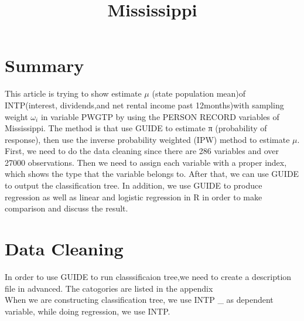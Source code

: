 \documentclass[12pt]{article}
\title{Mississippi}
\begin{document}
\maketitle{}
\newpage
\tableofcontents
\newpage
\section{Summary}
This article is trying to show estimate $\mu$ (state population mean)of INTP(interest, dividends,and net rental income past 12months)with sampling weight $\omega_i$ in variable PWGTP by using the PERSON RECORD variables of Mississippi. The method is that use GUIDE to estimate π (probability of response), then use the inverse probability weighted (IPW) method to estimate $\mu$. First, we need to do the data cleaning since there are 286 variables and over 27000 observations. Then we need to assign each variable with a proper index, which shows the type that the variable belongs to. After that, we can use GUIDE to output the classification tree. In addition, we use GUIDE to produce regression as well as linear and logistic regression in R in order to make comparison and discuss the result. 
\section{Data Cleaning}
In order to use GUIDE to run classsificaion tree,we need to create a description file in advanced. The catogories are listed in the appendix\\
When we are constructing classification tree, we use INTP \_ as dependent variable, while doing regression, we use INTP.
\end{document}

